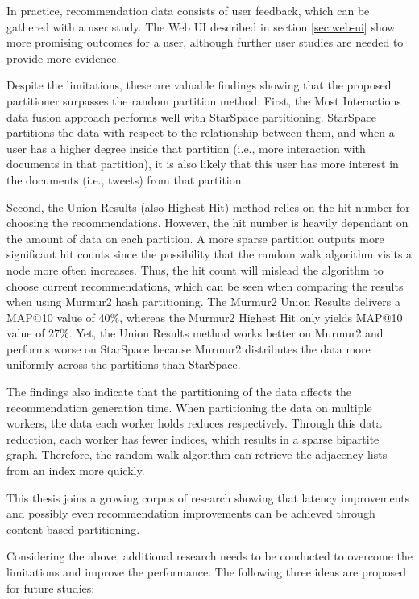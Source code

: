In practice, recommendation data consists of user feedback, which can be gathered with a user study. The Web UI described in section \ref{sec:web-ui} show more promising outcomes for a user, although further  user studies are needed to provide more evidence. 


Despite the limitations, these are valuable findings showing that the proposed partitioner surpasses the random partition method: First, the Most Interactions data fusion approach performs well with StarSpace partitioning. StarSpace partitions the data with respect to the relationship between them, and when a user has a higher degree inside that partition (i.e., more interaction with documents in that partition), it is also likely that this user has more interest in the documents (i.e., tweets) from that partition. 


Second, the Union Results (also Highest Hit) method relies on the hit number for choosing the recommendations. However, the hit number is heavily dependant on the amount of data on each partition. A more sparse partition outputs more significant hit counts since the possibility that the random walk algorithm visits a node more often increases. Thus, the hit count will mislead the algorithm to choose current recommendations, which can be seen when comparing the results when using Murmur2 hash partitioning. The Murmur2 Union Results delivers a MAP@10 value of 40\%, whereas the Murmur2 Highest Hit only yields MAP@10 value of 27\%. Yet, the Union Results method works better on Murmur2 and performs worse on StarSpace because Murmur2 distributes the data more uniformly across the partitions than StarSpace.


The findings also indicate that the partitioning of the data affects the recommendation generation time. When partitioning the data on multiple workers, the data each worker holds reduces respectively. Through this data reduction, each worker has fewer indices, which results in a sparse bipartite graph. Therefore, the random-walk algorithm can retrieve the adjacency lists from an index more quickly.


This thesis joins a growing corpus of research showing that latency improvements and possibly even recommendation improvements can be achieved through content-based partitioning.


Considering the above, additional research needs to be conducted to overcome the limitations and improve the performance. The following three ideas are proposed for future studies:

